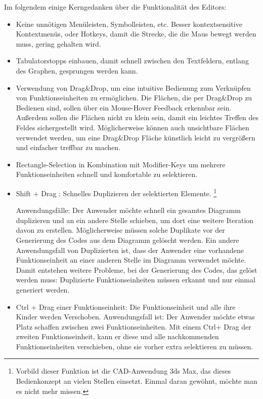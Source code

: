 \bigskip
Im folgendem einige Kerngedanken über die Funktionalität des Editors:

\begin{itemize}
\item Keine unnötigen Menüleisten, Symbolleisten, etc. Besser kontextsensitive
Kontextmenüs, oder Hotkeys,  damit die Strecke, die die Maus bewegt werden muss, gering
gehalten wird.
\item Tabulatorstopps einbauen, damit schnell zwischen den Textfeldern, entlang des
Graphen, gesprungen werden kann.
\item Verwendung von Drag\&Drop, um eine intuitive Bedienung zum Verknüpfen von
Funktionseinheiten zu ermöglichen. Die Flächen, die per Drag\&Drop zu Bedienen
sind, sollen über ein Mouse-Hover Feedback erkennbar sein. Außerdem sollen die
Flächen nicht zu klein sein, damit ein leichtes Treffen des Feldes
sichergestellt wird. Möglicherweise können auch unsichtbare Flächen verwendet
werden, um eine Drag\&Drop Fläche künstlich leicht zu vergrößern und einfacher treffbar zu machen.
\item Rectangle-Selection in Kombination mit Modifier-Keys um mehrere Funktionseinheiten
schnell und komfortable zu selektieren.
\item Shift + Drag : Schnelles Duplizieren der selektierten Elemente. 
\footnote{Vorbild dieser Funktion ist die CAD-Anwendung 3ds Max, das dieses Bedienkonzept an vielen Stellen einsetzt.
Einmal daran gewöhnt, möchte man es nicht mehr missen.} 

Anwendungsfälle:
Der Anwender möchte  schnell ein gesamtes Diagramm duplizieren und an ein andere Stelle schieben, um
dort eine weitere Iteration davon zu erstellen. Möglicherweise müssen solche
Duplikate vor der Generierung des Codes aus dem Diagramm gelöscht werden.
Ein andere Anwendungsfall von Duplizierten ist, dass der Anwender eine vorhandene
Funktionseinheit an einer anderen Stelle im Diagramm verwendet möchte. Damit
entstehen weitere Probleme, bei der Generierung des Codes, das gelöst werden
muss: Duplizierte Funktionseinheiten müssen erkannt und nur einmal generiert werden.
\item Ctrl + Drag einer Funktionseinheit: Die Funktionseinheit und alle ihre Kinder werden
Verschoben. Anwendungsfall ist: Der Anwender möchte etwas Platz schaffen
zwischen zwei Funktionseinheiten. Mit einem Ctrl+ Drag der zweiten Funktionseinheit,
kann er diese und alle nachkommenden Funktionseinheiten verschieben, ohne sie
vorher extra selektieren zu müssen.
\end{itemize}

